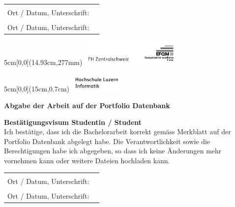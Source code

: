 \vspace{1em}

\noindent
\begin{tabularx}{\textwidth}{@{}lX}
	&\\
	Ort / Datum, Unterschrift: &  \\
	\cline{2-2}
	&\\[0.5cm]
	Ort / Datum, Unterschrift: &  \\
	\cline{2-2}
\end{tabularx}

\begin{textblock*}{5cm}[0,0](14.93cm,277mm)
	\includegraphics[keepaspectratio,width=5cm]{img/FHZ_Logo}
\end{textblock*}

\newpage

\begin{textblock*}{5cm}[0,0](15cm,0.7cm)
	\includegraphics[keepaspectratio,width=2.7cm]{img/HSLU_Logo_Header}
\end{textblock*}

\noindent
\textbf{Abgabe der Arbeit auf der Portfolio Datenbank}

\vspace{0.5em}

\noindent
\textbf{Bestätigungsvisum Studentin / Student}
\\
\noindent
Ich bestätige, dass ich die Bachelorarbeit korrekt gemäss Merkblatt auf der Portfolio Datenbank abgelegt habe. Die Verantwortlichkeit sowie die Berechtigungen habe ich abgegeben, so dass ich keine Änderungen mehr vornehmen kann oder weitere Dateien hochladen kann.

\vspace{0.7em}

\noindent
\begin{tabularx}{\textwidth}{@{}lX}
	&\\
	Ort / Datum, Unterschrift: &  \\
	\cline{2-2}
	&\\[0.5cm]
	Ort / Datum, Unterschrift: &  \\
	\cline{2-2}
\end{tabularx}

